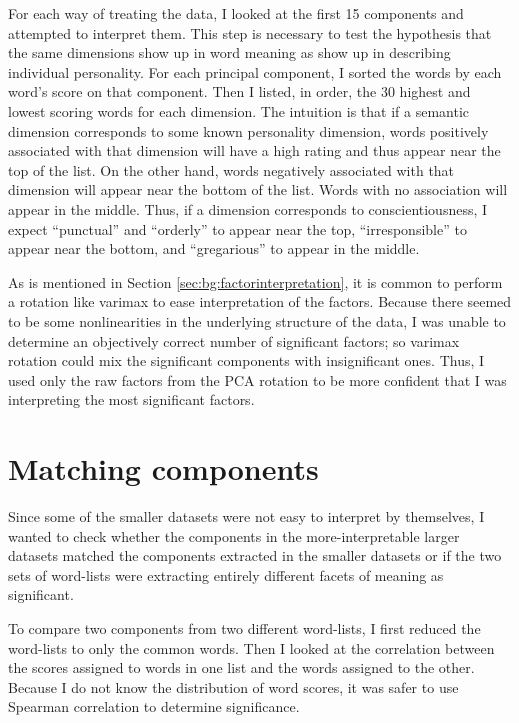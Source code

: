 For each way of treating the data, I looked at the first 15 components and 
attempted to interpret them. This step is necessary to test the hypothesis that 
the same dimensions show up in word meaning as show up in describing individual 
personality. For each principal component, I sorted the words by each word's 
score on that component. Then I listed, in order, the 30 highest and lowest 
scoring words for each dimension. The intuition is that if a semantic dimension 
corresponds to some known personality dimension, words positively associated 
with that dimension will have a high rating and thus appear near the top of the 
list. On the other hand, words negatively associated with that dimension will 
appear near the bottom of the list. Words with no association will appear in the 
middle. Thus, if a dimension corresponds to conscientiousness, I expect 
``punctual'' and ``orderly'' to appear near the top, ``irresponsible'' to appear 
near the bottom, and ``gregarious'' to appear in the middle.

As is mentioned in Section \ref{sec:bg:factorinterpretation}, it is common to 
perform a rotation like varimax to ease interpretation of the factors. Because 
there seemed to be some nonlinearities in the underlying structure of the data, 
I was unable to determine an objectively correct number of significant factors; 
so varimax rotation could mix the significant components with insignificant 
ones. Thus, I used only the raw factors from the PCA rotation to be more 
confident that I was interpreting the most significant factors.

\section{Matching components}
\label{sec:matchingcomponents}
Since some of the smaller datasets were not easy to interpret by themselves, I
wanted to check whether the components in the more-interpretable larger datasets
matched the components extracted in the smaller datasets or if the two sets
of word-lists were extracting entirely different facets of meaning as
significant.

To compare two components from two different word-lists, I first reduced the
word-lists to only the common words. Then I looked at the correlation between
the scores assigned to words in one list and the words assigned to the other.
Because I do not know the distribution of word scores, it was safer to use
Spearman correlation to determine significance.

